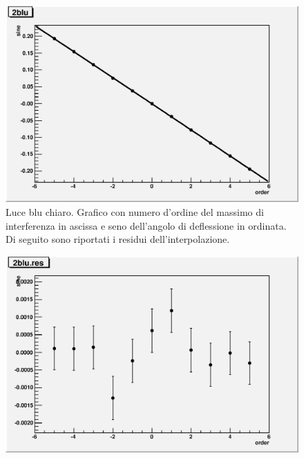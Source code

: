 \documentclass[italian,a4paper]{article}
\begin{document}
\begin{figure}[!h]\centering
\includegraphics[width=\textwidth]{2blu.eps}
\caption{Luce blu chiaro. Grafico con numero d'ordine del massimo di interferenza in ascissa e seno dell'angolo di deflessione in ordinata. Di seguito sono riportati i residui dell'interpolazione.}\label{2blu}
\end{figure}
\begin{figure}[!h]\centering
\includegraphics[width=\textwidth]{2blu.res.eps}
\end{figure}
\end{document}
